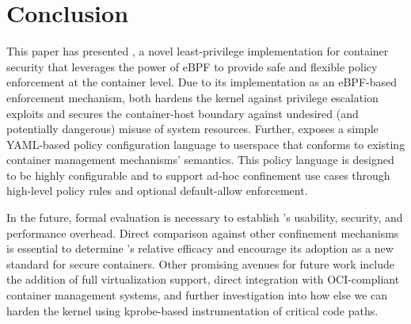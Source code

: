 \section{Conclusion}
\label{sec:conclusion}

This paper has presented \bpfcontain{}, a novel least-privilege implementation for container security that leverages the power of eBPF to provide safe and flexible policy enforcement at the container level. Due to its implementation as an eBPF-based enforcement mechanism, \bpfcontain{} both hardens the kernel against privilege escalation exploits and secures the container-host boundary against undesired (and potentially dangerous) misuse of system resources. Further, \bpfcontain{} exposes a simple YAML-based policy configuration language to userspace that conforms to existing container management mechanisms' semantics. This policy language is designed to be highly configurable and to support ad-hoc confinement use cases through high-level policy rules and optional default-allow enforcement.

In the future, formal evaluation is necessary to establish \bpfcontain{}'s usability, security, and performance overhead. Direct comparison against other confinement mechanisms is essential to determine \bpfcontain{}'s relative efficacy and encourage its adoption as a new standard for secure containers. Other promising avenues for future work include the addition of full virtualization support, direct integration with OCI-compliant container management systems, and further investigation into how else we can harden the kernel using kprobe-based instrumentation of critical code paths.
